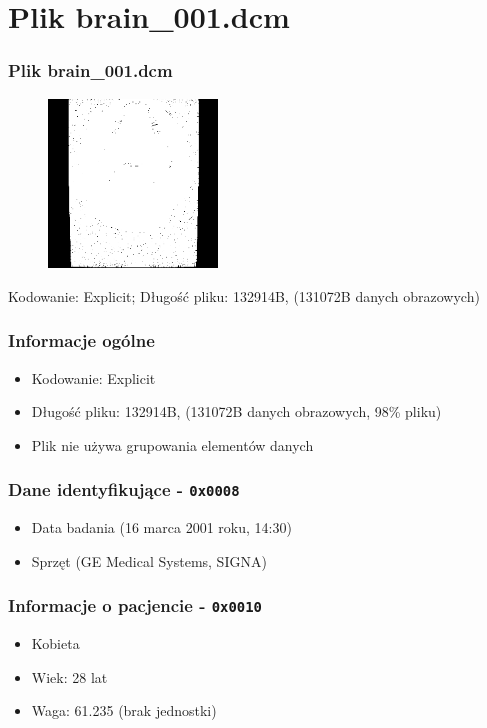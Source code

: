 
\section{Plik brain\_001.dcm}
\begin{frame}
  \frametitle{Plik brain\_001.dcm}

  \begin{figure}
    \includegraphics[width=0.4\textwidth]{brain}
  \end{figure}
  Kodowanie: Explicit; Długość pliku: 132914B, (131072B danych obrazowych)
\end{frame}

\begin{frame}
  \frametitle{Informacje ogólne}
  \begin{itemize}
    \item Kodowanie: Explicit
    \item Długość pliku: 132914B, (131072B danych obrazowych, 98\% pliku)
    \item Plik nie używa grupowania elementów danych
  \end{itemize}
\end{frame}

\begin{frame}
  \frametitle{Dane identyfikujące - \texttt{0x0008}}

  \begin{itemize}
    \item Data badania (16 marca 2001 roku, 14:30)
    \item Sprzęt (GE Medical Systems, SIGNA)
  \end{itemize}
\end{frame}


\begin{frame}
  \frametitle{Informacje o pacjencie - \texttt{0x0010}}

  \begin{itemize}
    \item Kobieta
    \item Wiek: 28 lat
    \item Waga: 61.235 (brak jednostki)
  \end{itemize}
\end{frame}

